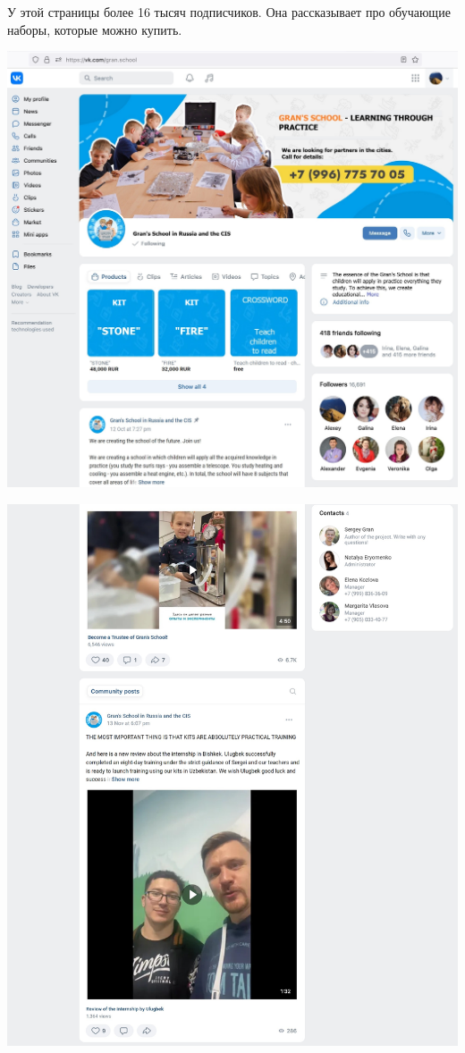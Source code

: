 
У этой страницы более 16 тысяч подписчиков. Она рассказывает про обучающие наборы,
которые можно купить.

\begin{center}
    \includegraphics[width=\textwidth]{school-vk_eng-p1}
\end{center}
\WillContinue
\pagebreak

\Continuing
\begin{center}
    \includegraphics[width=\textwidth]{school-vk_eng-p2}
\end{center}
\WillContinue
\pagebreak

